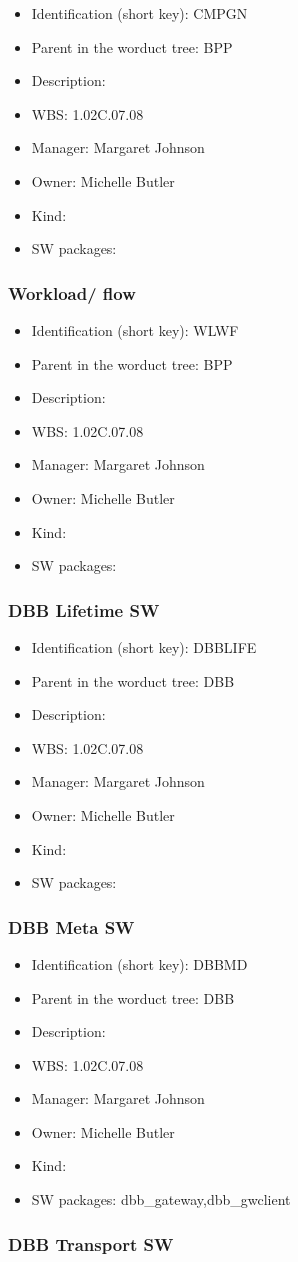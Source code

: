\begin{itemize}\item Identification (short key): CMPGN
\item Parent in the worduct tree: BPP
\item Description: 
\item WBS: 1.02C.07.08
\item Manager: Margaret Johnson
\item Owner: Michelle Butler
\item Kind:
\item SW packages: 
\end{itemize}\subsubsection{Workload/ flow}
\begin{itemize}\item Identification (short key): WLWF
\item Parent in the worduct tree: BPP
\item Description: 
\item WBS: 1.02C.07.08
\item Manager: Margaret Johnson
\item Owner: Michelle Butler
\item Kind:
\item SW packages: 
\end{itemize}\subsubsection{DBB Lifetime SW}
\begin{itemize}\item Identification (short key): DBBLIFE
\item Parent in the worduct tree: DBB
\item Description: 
\item WBS: 1.02C.07.08
\item Manager: Margaret Johnson
\item Owner: Michelle Butler
\item Kind:
\item SW packages: 
\end{itemize}\subsubsection{DBB Meta SW}
\begin{itemize}\item Identification (short key): DBBMD
\item Parent in the worduct tree: DBB
\item Description: 
\item WBS: 1.02C.07.08
\item Manager: Margaret Johnson
\item Owner: Michelle Butler
\item Kind:
\item SW packages: dbb\_gateway,dbb\_gwclient
\end{itemize}\subsubsection{DBB Transport SW}
